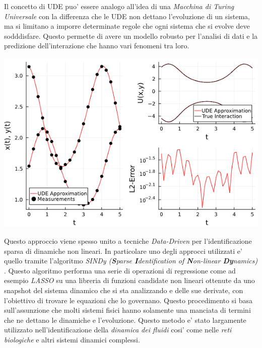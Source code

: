 Il concetto di UDE puo' essere analogo all'idea di una \emph{Macchina di Turing Universale}
\cite{wiki:Universal_Turing_machine} con la differenza che le UDE non dettano 
l'evoluzione di un sistema, ma si limitano a imporre determinate regole che 
ogni sistema che si evolve deve sodddisfare. Questo permette di avere un modello robusto 
per l'analisi di dati e la predizione dell'interazione che hanno vari fenomeni tra loro.

\begin{minipage}{\linewidth}
    \centering
    \includegraphics[scale=0.7]{img/ude_approx.png}
    \label{fig:UDE_approx}
\end{minipage}

Questo approccio viene spesso unito a tecniche \emph{Data-Driven} \cite{datadrivendiffeq} per l'identificazione
sparsa di dinamiche non lineari. In particolare uno degli approcci utilizzati 
e' quello tramite l'algoritmo \emph{SINDy (\textbf{S}parse \textbf{I}dentification of \textbf{N}on-linear \textbf{Dy}namics)} 
\cite{wiki:Sparse_identification_of_non-linear_dynamics}. 
Questo algoritmo performa una serie di operazioni di regressione come 
ad esempio \emph{LASSO} su una libreria di funzioni candidate non lineari ottenute
da uno snapshot del sistema dinamico che si sta analizzando e delle sue derivate, 
con l'obiettivo di trovare le equazioni che lo governano. Questo procedimento 
si basa sull'assunzione che molti sistemi fisici hanno solamente una manciata di 
termini che ne dettano le dinamiche e l'evoluzione. Questo metodo e' stato largamente
utilizzato nell'identificazione della \emph{dinamica dei fluidi} cosi' come
nelle \emph{reti biologiche} e altri sistemi dinamici complessi.